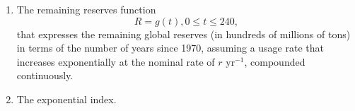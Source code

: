 \documentclass{ximera}
\newcommand{\pskip}{\vskip 0.1 in}
\begin{document}
\begin{question}
\begin{enumerate}
\item The remaining reserves function
\[
    R = g(t) , 0\leq t \leq 240,
\]
that expresses the remaining global reserves (in hundreds of millions of tons) in terms of the number of years since 1970, assuming a usage rate that increases exponentially at the nominal rate of $r \text{ yr}^{-1}$, compounded continuously.

\item The exponential index.










\end{enumerate}


\end{question}
\end{document}
